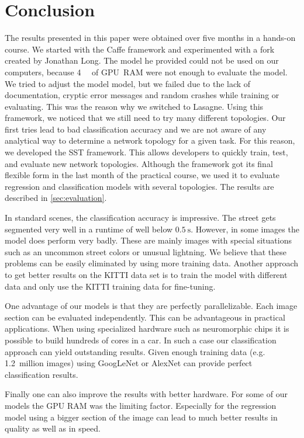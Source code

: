 
\section{Conclusion}\label{sec:discussion}

The results presented in this paper were obtained over five months in a
hands-on course. We started with the Caffe framework and experimented with
a fork created by Jonathan Long. The model he provided could not be used on our
computers, because \SI{4}{\gibi\byte} of GPU~RAM were not enough to evaluate
the model. We tried to adjust the model model, but we failed due to the lack of
documentation, cryptic error messages and random crashes while training or
evaluating. This was the reason why we switched to Lasagne. Using this
framework, we noticed that we still need to try many different topologies. Our
first tries lead to bad classification accuracy and we are not aware of any
analytical way to determine a network topology for a given task. For this
reason, we developed the SST framework. This allows developers to quickly
train, test, and evaluate new network topologies. Although the framework got
its final flexible form in the last month of the practical course, we used it
to evaluate regression and classification models with several topologies. The
results are described in \cref{sec:evaluation}.

In standard scenes, the classification accuracy is impressive. The street gets
segmented very well in a runtime of well below  $\SI{0.5}{\second}$. However,
in some images the model does perform very badly. These are mainly images with
special situations such as an uncommon street colors or unusual lightning. We
believe that these problems can be easily eliminated by using more training
data. Another approach to get better results on the KITTI data set is to train
the model with different data and only use the KITTI training data for
fine-tuning.

One advantage of our models is that they are perfectly parallelizable. Each
image section can be evaluated independently. This can be advantageous in
practical applications. When using specialized hardware such as neuromorphic
chips it is possible to build hundreds of cores in a car. In such a case our
classification approach can yield outstanding results. Given enough training
data (e.g. 1.2~million images) using GoogLeNet or AlexNet can provide perfect
classification results.

Finally one can also improve the results with better hardware. For some of our
models the \gls{GPU} RAM was the limiting factor. Especially for the regression
model using a bigger section of the image can lead to much better results in
quality as well as in speed.
